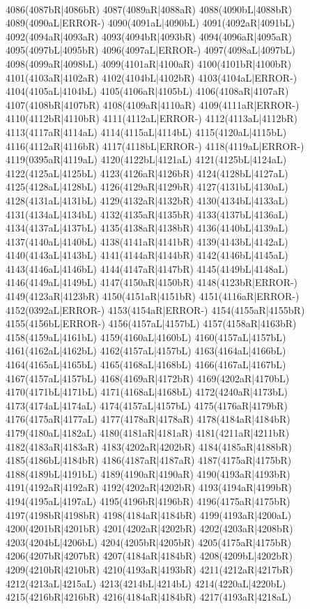 \\4086(4087bR|4086bR) 4087(4089aR|4088aR) 4088(4090bL|4088bR) 4089(4090aL|ERROR-) 4090(4091aL|4090bL) 4091(4092aR|4091bL) 4092(4094aR|4093aR) 4093(4094bR|4093bR) 4094(4096aR|4095aR) \\4095(4097bL|4095bR) 4096(4097aL|ERROR-) 4097(4098aL|4097bL) 4098(4099aR|4098bL) 4099(4101aR|4100aR) 4100(4101bR|4100bR) 4101(4103aR|4102aR) 4102(4104bL|4102bR) 4103(4104aL|ERROR-) \\4104(4105aL|4104bL) 4105(4106aR|4105bL) 4106(4108aR|4107aR) 4107(4108bR|4107bR) 4108(4109aR|4110aR) 4109(4111aR|ERROR-) 4110(4112bR|4110bR) 4111(4112aL|ERROR-) 4112(4113aL|4112bR) \\4113(4117aR|4114aL) 4114(4115aL|4114bL) 4115(4120aL|4115bL) 4116(4112aR|4116bR) 4117(4118bL|ERROR-) 4118(4119aL|ERROR-) 4119(0395aR|4119aL) 4120(4122bL|4121aL) 4121(4125bL|4124aL) \\4122(4125aL|4125bL) 4123(4126aR|4126bR) 4124(4128bL|4127aL) 4125(4128aL|4128bL) 4126(4129aR|4129bR) 4127(4131bL|4130aL) 4128(4131aL|4131bL) 4129(4132aR|4132bR) 4130(4134bL|4133aL) \\4131(4134aL|4134bL) 4132(4135aR|4135bR) 4133(4137bL|4136aL) 4134(4137aL|4137bL) 4135(4138aR|4138bR) 4136(4140bL|4139aL) 4137(4140aL|4140bL) 4138(4141aR|4141bR) 4139(4143bL|4142aL) \\4140(4143aL|4143bL) 4141(4144aR|4144bR) 4142(4146bL|4145aL) 4143(4146aL|4146bL) 4144(4147aR|4147bR) 4145(4149bL|4148aL) 4146(4149aL|4149bL) 4147(4150aR|4150bR) 4148(4123bR|ERROR-) \\4149(4123aR|4123bR) 4150(4151aR|4151bR) 4151(4116aR|ERROR-) 4152(0392aL|ERROR-) 4153(4154aR|ERROR-) 4154(4155aR|4155bR) 4155(4156bL|ERROR-) 4156(4157aL|4157bL) 4157(4158aR|4163bR) \\4158(4159aL|4161bL) 4159(4160aL|4160bL) 4160(4157aL|4157bL) 4161(4162aL|4162bL) 4162(4157aL|4157bL) 4163(4164aL|4166bL) 4164(4165aL|4165bL) 4165(4168aL|4168bL) 4166(4167aL|4167bL) \\4167(4157aL|4157bL) 4168(4169aR|4172bR) 4169(4202aR|4170bL) 4170(4171bL|4171bL) 4171(4168aL|4168bL) 4172(4240aR|4173bL) 4173(4174aL|4174aL) 4174(4157aL|4157bL) 4175(4176aR|4179bR) \\4176(4175aR|4177aL) 4177(4178aR|4178aR) 4178(4184aR|4184bR) 4179(4180aL|4182aL) 4180(4181aR|4181aR) 4181(4211aR|4211bR) 4182(4183aR|4183aR) 4183(4202aR|4202bR) 4184(4185aR|4188bR) \\4185(4186bL|4184bR) 4186(4187aR|4187aR) 4187(4175aR|4175bR) 4188(4189bL|4191bL) 4189(4190aR|4190aR) 4190(4193aR|4193bR) 4191(4192aR|4192aR) 4192(4202aR|4202bR) 4193(4194aR|4199bR) \\4194(4195aL|4197aL) 4195(4196bR|4196bR) 4196(4175aR|4175bR) 4197(4198bR|4198bR) 4198(4184aR|4184bR) 4199(4193aR|4200aL) 4200(4201bR|4201bR) 4201(4202aR|4202bR) 4202(4203aR|4208bR) \\4203(4204bL|4206bL) 4204(4205bR|4205bR) 4205(4175aR|4175bR) 4206(4207bR|4207bR) 4207(4184aR|4184bR) 4208(4209bL|4202bR) 4209(4210bR|4210bR) 4210(4193aR|4193bR) 4211(4212aR|4217bR) \\4212(4213aL|4215aL) 4213(4214bL|4214bL) 4214(4220aL|4220bL) 4215(4216bR|4216bR) 4216(4184aR|4184bR) 4217(4193aR|4218aL) 